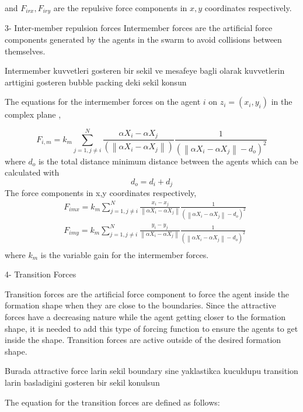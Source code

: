\documentclass[twoside]{article}
\newcommand{\norm}[1]{\left\lVert#1\right\rVert}
\begin{document}
\begin{multicols}{2}
						and $F_{irx} , F_{iry} $ are the repulsive force components in $x,y$ coordinates respectively.
						
			
			3- Inter-member repulsion forces
			Intermember forces are the artificial force components generated by the agents in the swarm to avoid collisions between themselves. 
			
			Intermember kuvvetleri gosteren bir sekil ve mesafeye bagli olarak kuvvetlerin arttigini gosteren bubble packing deki sekil konsun
			
			The equations for the intermember forces on the agent $i$ on $z_i = (x_i, y_i)$  in the complex plane ,
			
			\begin{equation}
F_{i,m} = k_m \sum_{j=1, j\neq i}^{N}\frac{\alpha X_i - \alpha X_j}{(\norm{\alpha X_i - \alpha X_j})} \frac{1}{(\norm{\alpha X_i - \alpha X_j} - d_o)^2}
			\end{equation}
			where $d_o$ is the total distance minimum distance between the agents which can be calculated with
			\begin{equation}
 d_o = d_i + d_j
			\end{equation}
			The force components in x,y coordinates respectively,
			\begin{align*}
&F_{imx} = k_m \sum_{j=1, j\neq i}^{N}\frac{x_i- x_j}{\norm{\alpha X_i - \alpha X_j}}  \frac{1}{(\norm{\alpha X_i - \alpha X_j} - d_o)^2}\\
&F_{imy} = k_m \sum_{j=1, j\neq i}^{N}\frac{y_i- y_j}{\norm{\alpha X_i - \alpha X_j}}  \frac{1}{(\norm{\alpha X_i - \alpha X_j} - d_o)^2}\\
			\end{align*}
			where $k_m$ is the variable gain for the intermember forces. 
			
			
			4- Transition Forces
			
			Transition forces are the artificial force component to force the agent inside the formation shape when they are close to the boundaries. Since the attractive forces have a decreasing nature while the agent getting closer to the formation shape, it is needed to add this type of forcing function to ensure the agents to get inside the shape. Transition forces are active outside of the desired formation shape.
			
			Burada attractive force larin sekil boundary sine yaklastikca kuculdupu transition larin basladigini gosteren bir sekil konulsun
			
				The equation for the transition forces are defined as follows:	
				

\end{multicols}
\end{document}
